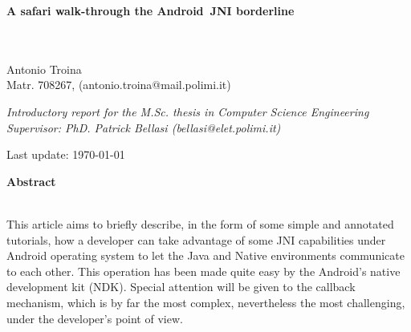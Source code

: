 \documentclass[a4paper,10pt]{article}
\newenvironment*{mytitle}{\begin{LARGE}\bf}{\end{LARGE}\\}%
\newenvironment*{mysubtitle}{\bf}{\\[1.5ex]}%
\newenvironment*{myabstract}{\begin{Large}\bf}{\end{Large}\\[2.5ex]}%
\begin{document}
\begin{mytitle}
A safari walk-through the Android\texttrademark \ JNI borderline
\end{mytitle}
%
%
\\
Antonio Troina\\
Matr. 708267, (antonio.troina@mail.polimi.it)\\
\hspace{10ex}
\begin{flushright}
\emph{Introductory report for the M.Sc. thesis in Computer Science Engineering}
\\
\emph{Supervisor: PhD. Patrick Bellasi (bellasi@elet.polimi.it)}
\end{flushright}

Last update: \today
\\
\hspace{10ex}

\begin{myabstract} Abstract \end{myabstract}
This article aims to briefly describe, in the form of some simple and annotated
tutorials, how a developer can take advantage of some JNI capabilities under
Android operating system to let the Java and Native environments communicate to
each other. This operation has been made quite easy by the Android's native
development kit (NDK). Special attention will be given to the callback
mechanism, which is by far the most complex, nevertheless the most challenging,
under the developer's point of view.
\end{document}
